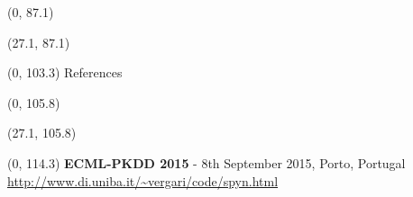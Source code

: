 \documentclass[final]{beamer}
\begin{document}
\begin{frame}{}
  \begin{textblock}{25.7}(0, 87.1)
    \small
    \blindtext
  \end{textblock}
  
  \begin{textblock}{25.7}(27.1, 87.1)
    \small
    \blindtext
  \end{textblock}
  
  
  
  
  \begin{textblock}{80}(0, 103.3)
    References
  \end{textblock}
  

  \begin{textblock}{52}(0, 105.8)
    \small
    \setlength\bibitemsep{8pt}
    \printbibliography
  \end{textblock}
  
  \begin{textblock}{25.7}(27.1, 105.8)
    \small
  \end{textblock}
  

  \begin{textblock}{80}(0, 114.3)
    \textbf{ECML-PKDD 2015} - 8th September 2015, Porto, Portugal\hfill
    {\url{http://www.di.uniba.it/~vergari/code/spyn.html}}
  \end{textblock}
  
\end{frame}
\end{document}
